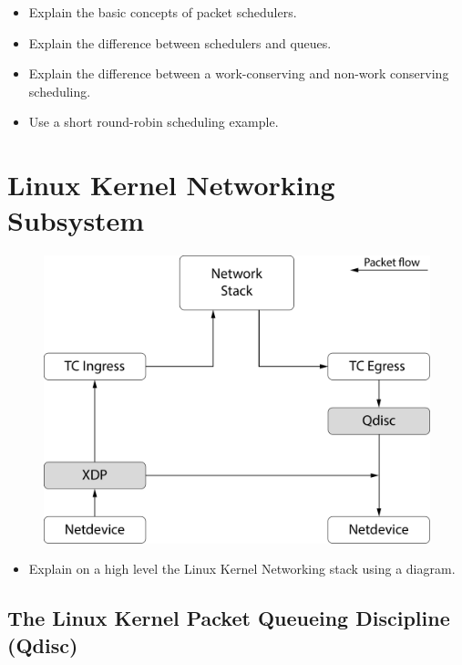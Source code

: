 \documentclass[sigconf, nonacm]{acmart}
\begin{document}
\begin{itemize}
  \item Explain the basic concepts of packet schedulers.
  \item Explain the difference between schedulers and queues.
  \item Explain the difference between a work-conserving and non-work conserving scheduling.
  \item Use a short round-robin scheduling example.
\end{itemize}

\section{Linux Kernel Networking Subsystem}

\begin{figure}

  \includegraphics[width=\linewidth]{network-overview.pdf}

  \caption{\label{fig:network_overview}}
\end{figure}

\begin{itemize}
  \item Explain on a high level the Linux Kernel Networking stack using a diagram.
\end{itemize}

\subsection{The Linux Kernel Packet Queueing Discipline (Qdisc)}
\end{document}
